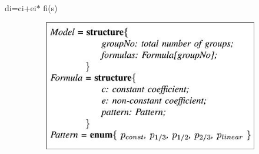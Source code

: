 \documentclass[12pt]{article}
\begin{document}
\vspace{\baselineskip}
\begin{adjustwidth}{2.6in}{0.0in}
{\fontsize{11pt}{13.2pt}\selectfont \textcolor[HTML]{333333}{di=ci+ei$\ast$ fi(s)}\par}\par

\end{adjustwidth}




\begin{figure}[H]
\advance\leftskip 0.02in		\includegraphics[width=4.31in,height=2.24in]{./media/image2.jpeg}
\end{figure}



\par


\vspace{\baselineskip}

\vspace{\baselineskip}

\vspace{\baselineskip}

\vspace{\baselineskip}

\vspace{\baselineskip}

\vspace{\baselineskip}

\vspace{\baselineskip}

\vspace{\baselineskip}

\vspace{\baselineskip}

\vspace{\baselineskip}
\end{document}
